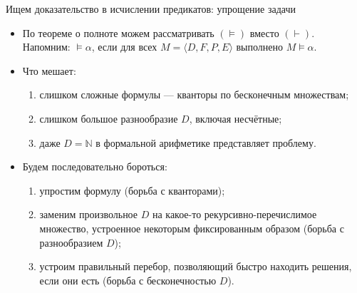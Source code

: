 \documentclass[aspectratio=169]{beamer}
\begin{document}
\begin{frame}{Ищем доказательство в исчислении предикатов: упрощение задачи}

\begin{itemize}
\item По теореме о полноте можем рассматривать $(\models)$ вместо $(\vdash)$. 
Напомним: $\models \alpha$, если для всех $M = \langle D, F, P, E \rangle$ выполнено $M \models \alpha$.\pause
\vspace{0.3cm}

\item Что мешает:
\begin{enumerate}
\item слишком сложные формулы --- кванторы по бесконечным множествам;
\item слишком большое разнообразие $D$, включая несчётные;
\item даже $D = \mathbb{N}$ в формальной арифметике представляет проблему.
\end{enumerate}\pause
\vspace{0.3cm}

\item Будем последовательно бороться:
\begin{enumerate}
\item упростим формулу (борьба с кванторами);
\item заменим произвольное $D$ на какое-то рекурсивно-перечислимое множество, устроенное некоторым фиксированным образом (борьба с разнообразием $D$);
\item устроим правильный перебор, позволяющий быстро находить решения, если они есть (борьба с бесконечностью $D$).
\end{enumerate}
\end{itemize}
\end{frame}
\end{document}
